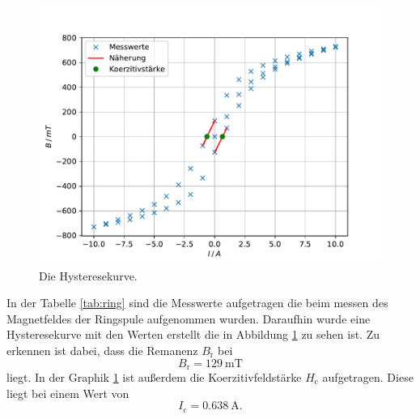 \begin{figure}
\centering
\includegraphics[width=\textwidth]{content/data/plot_ring.pdf}
\caption{Die Hysteresekurve.}
\label{fig:ring}
\end{figure}

In der Tabelle \ref{tab:ring} sind die Messwerte aufgetragen die beim messen des Magnetfeldes der Ringspule aufgenommen wurden.
Daraufhin wurde eine Hysteresekurve mit den Werten erstellt die in Abbildung \ref{fig:ring} zu sehen ist.
Zu erkennen ist dabei, dass die Remanenz $B_\text{r}$ bei 
\begin{equation*}
  B_\text{r} =\SI{129}{\milli\tesla}
\end{equation*}
liegt.
In der Graphik \ref{fig:ring} ist außerdem die Koerzitivfeldstärke $H_\text{c}$ aufgetragen.
Diese liegt bei einem Wert von
\begin{equation*}
  I_\text{c} =\SI{0.638}{\ampere}.
\end{equation*}

